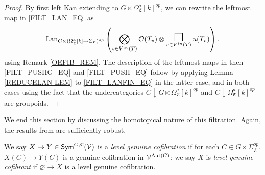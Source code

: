 \documentclass[a4paper,10pt
,draft
]{article}%
\renewcommand{\1}{\eta}%
\newcommand{\SC}{\Sigma_{\mathfrak C}}
\newcommand{\OC}{\Omega_{\mathfrak C}}
\begin{document}
\begin{proof}
      By first left Kan extending to $G \ltimes \OC^a[k]^{op}$, we can rewrite the leftmost map in \eqref{FILT_LAN_EQ} as
      \begin{equation}
            \label{FILT_LANFIN_EQ}
            \Lan_{G \ltimes (\OC^a[k] \to \SC)^{op}}\left(
                  \bigotimes_{v \in V^{ac}(T)}\O(T_v) \otimes
                  \mathop{\mathlarger{\mathlarger{\mathlarger{\square}}}}\limits_{v \in V^{in}(T)} u(T_v)
            \right).
      \end{equation}
      using Remark \ref{OEFIB_REM}.
      The description of the leftmost maps in then \eqref{FILT_PUSHG_EQ} and \eqref{FILT_PUSH_EQ} follow by
      applying Lemma \ref{REDUCELAN LEM} to \eqref{FILT_LANFIN_EQ} in the latter case,
      and in both cases using the fact that the undercategories
      $C \downarrow G \ltimes \OC^a[k]^{op}$ and
      $C \downarrow \OC^a[k]^{op}$ are groupoids.
\end{proof}






We end this section by discussing the homotopical nature of this filtration.
Again, the results from \cite{BP_geo} are sufficiently robust.

We say $X \to Y \in \mathsf{Sym}^{G, \mathfrak C}(\mathcal V)$ is a \textit{level genuine cofibration} if for each $C \in G \ltimes \SC^{op}$,
$X(C) \to Y(C)$ is a genuine cofibration in $\mathcal V^{\operatorname{Aut}(C)}$;
we say $X$ is \textit{level genuine cofibrant} if $\varnothing \to X$ is a level genuine cofibration.
\end{document}
